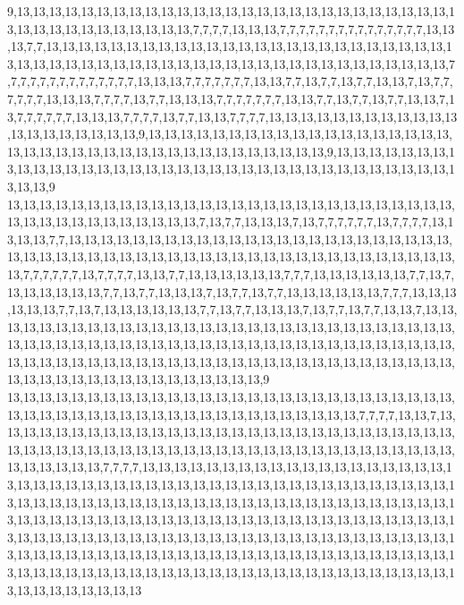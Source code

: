 9,13,13,13,13,13,13,13,13,13,13,13,13,13,13,13,13,13,13,13,13,13,13,13,13,13,13,13,13,13,13,13,13,13,13,13,13,13,13,13,7,7,7,7,13,13,13,7,7,7,7,7,7,7,7,7,7,7,7,7,7,7,13,13,13,7,7,13,13,13,13,13,13,13,13,13,13,13,13,13,13,13,13,13,13,13,13,13,13,13,13,13,13,13,13,13,13,13,13,13,13,13,13,13,13,13,13,13,13,13,13,13,13,13,13,13,13,13,13,13,7,7,7,7,7,7,7,7,7,7,7,7,7,7,13,13,13,7,7,7,7,7,7,7,13,13,7,7,13,7,7,13,7,7,13,13,7,13,7,7,7,7,7,7,13,13,13,7,7,7,7,13,7,7,13,13,13,7,7,7,7,7,7,7,13,13,7,7,13,7,7,13,7,7,13,13,7,13,7,7,7,7,7,7,13,13,13,7,7,7,7,13,7,7,13,13,7,7,7,7,13,13,13,13,13,13,13,13,13,13,13,13,13,13,13,13,13,13,13,13,9,13,13,13,13,13,13,13,13,13,13,13,13,13,13,13,13,13,13,13,13,13,13,13,13,13,13,13,13,13,13,13,13,13,13,13,13,13,13,13,9,13,13,13,13,13,13,13,13,13,13,13,13,13,13,13,13,13,13,13,13,13,13,13,13,13,13,13,13,13,13,13,13,13,13,13,13,13,13,9
13,13,13,13,13,13,13,13,13,13,13,13,13,13,13,13,13,13,13,13,13,13,13,13,13,13,13,13,13,13,13,13,13,13,13,13,13,13,13,13,7,13,7,7,13,13,13,7,13,7,7,7,7,7,7,13,7,7,7,7,13,13,13,13,7,7,13,13,13,13,13,13,13,13,13,13,13,13,13,13,13,13,13,13,13,13,13,13,13,13,13,13,13,13,13,13,13,13,13,13,13,13,13,13,13,13,13,13,13,13,13,13,13,13,13,13,13,13,13,7,7,7,7,7,7,13,7,7,7,7,13,13,7,7,13,13,13,13,13,13,7,7,7,13,13,13,13,13,13,7,7,13,7,13,13,13,13,13,13,7,7,13,7,7,13,13,13,7,13,7,7,13,7,7,13,13,13,13,13,13,7,7,7,13,13,13,13,13,13,7,7,13,7,13,13,13,13,13,13,7,7,13,7,7,13,13,13,7,13,7,7,13,7,7,13,13,7,13,13,13,13,13,13,13,13,13,13,13,13,13,13,13,13,13,13,13,13,13,13,13,13,13,13,13,13,13,13,13,13,13,13,13,13,13,13,13,13,13,13,13,13,13,13,13,13,13,13,13,13,13,13,13,13,13,13,13,13,13,13,13,13,13,13,13,13,13,13,13,13,13,13,13,13,13,13,13,13,13,13,13,13,13,13,13,13,13,13,13,13,13,13,13,13,13,13,13,13,13,13,9
13,13,13,13,13,13,13,13,13,13,13,13,13,13,13,13,13,13,13,13,13,13,13,13,13,13,13,13,13,13,13,13,13,13,13,13,13,13,13,13,13,13,13,13,13,13,13,13,13,13,7,7,7,7,13,13,7,13,13,13,13,13,13,13,13,13,13,13,13,13,13,13,13,13,13,13,13,13,13,13,13,13,13,13,13,13,13,13,13,13,13,13,13,13,13,13,13,13,13,13,13,13,13,13,13,13,13,13,13,13,13,13,13,13,13,13,13,13,13,13,7,7,7,7,13,13,13,13,13,13,13,13,13,13,13,13,13,13,13,13,13,13,13,13,13,13,13,13,13,13,13,13,13,13,13,13,13,13,13,13,13,13,13,13,13,13,13,13,13,13,13,13,13,13,13,13,13,13,13,13,13,13,13,13,13,13,13,13,13,13,13,13,13,13,13,13,13,13,13,13,13,13,13,13,13,13,13,13,13,13,13,13,13,13,13,13,13,13,13,13,13,13,13,13,13,13,13,13,13,13,13,13,13,13,13,13,13,13,13,13,13,13,13,13,13,13,13,13,13,13,13,13,13,13,13,13,13,13,13,13,13,13,13,13,13,13,13,13,13,13,13,13,13,13,13,13,13,13,13,13,13,13,13,13,13,13,13,13,13,13,13,13,13,13,13,13,13,13,13,13,13,13,13,13,13,13,13,13,13,13,13,13,13,13,13,13,13,13,13,13
